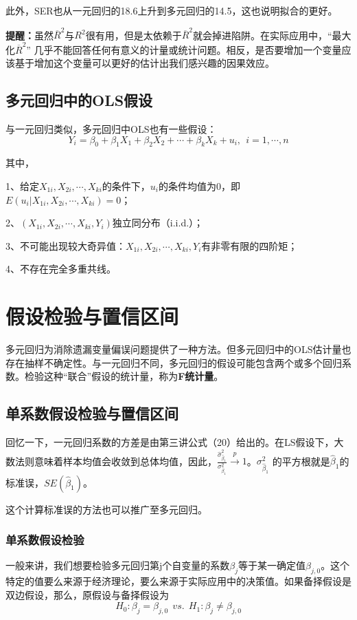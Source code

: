 \documentclass[cn,10pt,math=newtx,citestyle=gb7714-2015,bibstyle=gb7714-2015]{elegantbook}
\begin{document}
	此外，SER也从一元回归的18.6上升到多元回归的14.5，这也说明拟合的更好。
	
	\textbf{提醒：}虽然$\overline{R}^2$与$R^2$很有用，但是太依赖于$\overline{R}^2$就会掉进陷阱。在实际应用中，“最大化$\overline{R}^2$” 几乎不能回答任何有意义的计量或统计问题。相反，是否要增加一个变量应该基于增加这个变量可以更好的估计出我们感兴趣的因果效应。
	
	\subsection{多元回归中的OLS假设}
	与一元回归类似，多元回归中OLS也有一些假设：
	\begin{equation}
		Y_i=\beta_0+\beta_1X_1+\beta_2X_2+\cdots+\beta_kX_k+u_i,~~i=1,\cdots,n
	\end{equation}
	
	其中，
	
	1、给定$X_{1i},X_{2i},\cdots,X_{ki}$的条件下，$u_i$的条件均值为0，即$E(u_i|X_{1i},X_{2i},\cdots,X_{ki})=0$；
	
	2、$(X_{1i},X_{2i},\cdots,X_{ki},Y_i)$独立同分布（i.i.d.）；
	
	3、不可能出现较大奇异值：$X_{1i},X_{2i},\cdots,X_{ki},Y_i$有非零有限的四阶矩；
	
	4、不存在完全多重共线。
	
	\section{假设检验与置信区间}
	多元回归为消除遗漏变量偏误问题提供了一种方法。但多元回归中的OLS估计量也存在抽样不确定性。与一元回归不同，多元回归的假设可能包含两个或多个回归系数。检验这种“联合”假设的统计量，称为\textbf{F统计量}。
	
	\subsection{单系数假设检验与置信区间}
	回忆一下，一元回归系数的方差是由第三讲公式（20）给出的。在LS假设下，大数法则意味着样本均值会收敛到总体均值，因此，$\frac{\hat{\sigma}_{\hat{\beta}_1}^2}{\sigma_{\hat{\beta}_1}^2}\xrightarrow{p}1$。$\sigma_{\hat{\beta}_1}^2$ 的平方根就是$\hat{\beta}_1$的标准误，$SE(\hat{\beta}_1)$。
	
	这个计算标准误的方法也可以推广至多元回归。
	
	\subsubsection{单系数假设检验}
	一般来讲，我们想要检验多元回归第j个自变量的系数$\beta_j$等于某一确定值$\beta_{j,0}$。这个特定的值要么来源于经济理论，要么来源于实际应用中的决策值。如果备择假设是双边假设，那么，原假设与备择假设为
	\begin{equation}
		H_0:\beta_j=\beta_{j,0}~~vs.~~H_1:\beta_j\neq\beta_{j,0}
	\end{equation}
	
\end{document}
